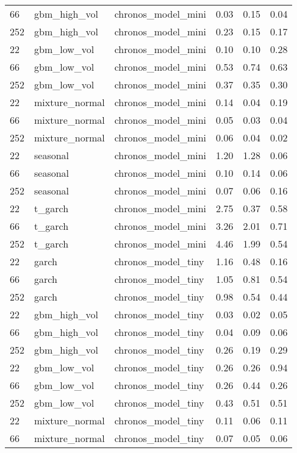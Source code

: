{\begin{tabular}{lllrrr}
66 & gbm\_high\_vol & chronos\_model\_mini & 0.03 & 0.15 & 0.04 \\
252 & gbm\_high\_vol & chronos\_model\_mini & 0.23 & 0.15 & 0.17 \\
\midrule
22 & gbm\_low\_vol & chronos\_model\_mini & 0.10 & 0.10 & 0.28 \\
66 & gbm\_low\_vol & chronos\_model\_mini & 0.53 & 0.74 & 0.63 \\
252 & gbm\_low\_vol & chronos\_model\_mini & 0.37 & 0.35 & 0.30 \\
\midrule
22 & mixture\_normal & chronos\_model\_mini & 0.14 & 0.04 & 0.19 \\
66 & mixture\_normal & chronos\_model\_mini & 0.05 & 0.03 & 0.04 \\
252 & mixture\_normal & chronos\_model\_mini & 0.06 & 0.04 & 0.02 \\
\midrule
22 & seasonal & chronos\_model\_mini & 1.20 & 1.28 & 0.06 \\
66 & seasonal & chronos\_model\_mini & 0.10 & 0.14 & 0.06 \\
252 & seasonal & chronos\_model\_mini & 0.07 & 0.06 & 0.16 \\
\midrule
22 & t\_garch & chronos\_model\_mini & 2.75 & 0.37 & 0.58 \\
66 & t\_garch & chronos\_model\_mini & 3.26 & 2.01 & 0.71 \\
252 & t\_garch & chronos\_model\_mini & 4.46 & 1.99 & 0.54 \\
\midrule
22 & garch & chronos\_model\_tiny & 1.16 & 0.48 & 0.16 \\
66 & garch & chronos\_model\_tiny & 1.05 & 0.81 & 0.54 \\
252 & garch & chronos\_model\_tiny & 0.98 & 0.54 & 0.44 \\
\midrule
22 & gbm\_high\_vol & chronos\_model\_tiny & 0.03 & 0.02 & 0.05 \\
66 & gbm\_high\_vol & chronos\_model\_tiny & 0.04 & 0.09 & 0.06 \\
252 & gbm\_high\_vol & chronos\_model\_tiny & 0.26 & 0.19 & 0.29 \\
\midrule
22 & gbm\_low\_vol & chronos\_model\_tiny & 0.26 & 0.26 & 0.94 \\
66 & gbm\_low\_vol & chronos\_model\_tiny & 0.26 & 0.44 & 0.26 \\
252 & gbm\_low\_vol & chronos\_model\_tiny & 0.43 & 0.51 & 0.51 \\
\midrule
22 & mixture\_normal & chronos\_model\_tiny & 0.11 & 0.06 & 0.11 \\
66 & mixture\_normal & chronos\_model\_tiny & 0.07 & 0.05 & 0.06 \\

\end{tabular}}
